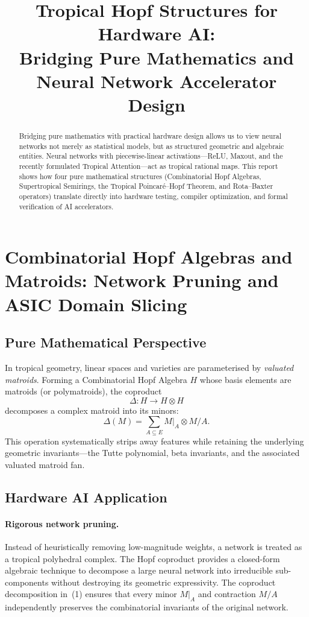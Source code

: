 \documentclass[11pt]{article}
\title{\textbf{Tropical Hopf Structures for Hardware AI:\\
Bridging Pure Mathematics and Neural Network Accelerator Design}}
\author{}
\date{}
\begin{document}
\maketitle

\begin{abstract}
Bridging pure mathematics with practical hardware design allows us to view neural networks not merely as statistical models, but as structured geometric and algebraic entities. Neural networks with piecewise-linear activations---ReLU, Maxout, and the recently formulated Tropical Attention---act as tropical rational maps. This report shows how four pure mathematical structures (Combinatorial Hopf Algebras, Supertropical Semirings, the Tropical Poincar\'{e}--Hopf Theorem, and Rota--Baxter operators) translate directly into hardware testing, compiler optimization, and formal verification of AI accelerators.
\end{abstract}

\section{Combinatorial Hopf Algebras and Matroids: Network Pruning and ASIC Domain Slicing}

\subsection{Pure Mathematical Perspective}

In tropical geometry, linear spaces and varieties are parameterised by \emph{valuated matroids}. Forming a Combinatorial Hopf Algebra $H$ whose basis elements are matroids (or polymatroids), the coproduct
\[
\Delta \colon H \to H \otimes H
\]
decomposes a complex matroid into its minors:
\begin{equation}
\Delta(M) = \sum_{A \subseteq E} M|_A \otimes M/A.
\end{equation}
This operation systematically strips away features while retaining the underlying geometric invariants---the Tutte polynomial, beta invariants, and the associated valuated matroid fan.

\subsection{Hardware AI Application}

\paragraph{Rigorous network pruning.}
Instead of heuristically removing low-magnitude weights, a network is treated as a tropical polyhedral complex. The Hopf coproduct provides a closed-form algebraic technique to decompose a large neural network into irreducible sub-components without destroying its geometric expressivity. The coproduct decomposition in~(1) ensures that every minor $M|_A$ and contraction $M/A$ independently preserves the combinatorial invariants of the original network.
\end{document}
